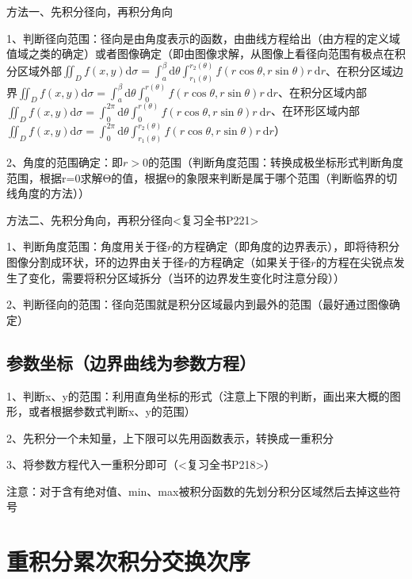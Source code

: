 方法一、先积分径向，再积分角向

1、判断径向范围：径向是由角度表示的函数，由曲线方程给出（由方程的定义域值域之类的确定）或者图像确定（即由图像求解，从图像上看径向范围有极点在积分区域外部$\iint_{D} f(x, y) \mathrm{d} \sigma=\int_{a}^{\beta} \mathrm{d} \theta \int_{r_{1}(\theta)}^{r_{2}(\theta)} f(r \cos \theta, r \sin \theta) r \mathrm{~d} r$、在积分区域边界$\iint_{D} f(x, y) \mathrm{d} \sigma=\int_{a}^{\beta} \mathrm{d} \theta \int_{0}^{r(\theta)} f(r \cos \theta, r \sin \theta) r \mathrm{~d} r$、在积分区域内部$\iint_{D} f(x, y) \mathrm{d} \sigma=\int_{0}^{2 \pi} \mathrm{d} \theta \int_{0}^{r(\theta)} f(r \cos \theta, r \sin \theta) r \mathrm{~d} r$、在环形区域内部$\iint_{D} f(x, y) \mathrm{d} \sigma=\int_{0}^{2 \pi} \mathrm{d} \theta \int_{r_{1}(\theta)}^{r_{2}(\theta)} f(r \cos \theta, r \sin \theta) r \mathrm{~d} r$）

2、角度的范围确定：即$r > 0 $的范围（判断角度范围：转换成极坐标形式判断角度范围，根据r=0求解Θ的值，根据Θ的象限来判断是属于哪个范围（判断临界的切线角度的方法））

方法二、先积分角向，再积分径向<复习全书P221>

1、判断角度范围：角度用关于径$r$的方程确定（即角度的边界表示），即将待积分图像分割成环状，环的边界由关于径$r$的方程确定（如果关于径$r$的方程在尖锐点发生了变化，需要将积分区域拆分（当环的边界发生变化时注意分段））

2、判断径向的范围：径向范围就是积分区域最内到最外的范围（最好通过图像确定）



\subsection{参数坐标（边界曲线为参数方程）}

1、判断x、y的范围：利用直角坐标的形式（注意上下限的判断，画出来大概的图形，或者根据参数式判断x、y的范围）

2、先积分一个未知量，上下限可以先用函数表示，转换成一重积分

3、将参数方程代入一重积分即可（<复习全书P218>）



注意：对于含有绝对值、min、max被积分函数的先划分积分区域然后去掉这些符号

\section{重积分累次积分交换次序}



